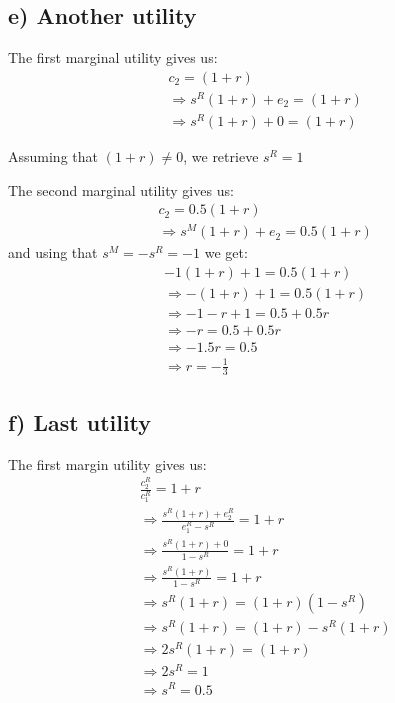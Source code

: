 \documentclass[11pt,a4paper]{article}
\begin{document}
\subsection*{e) Another utility}
The first marginal utility gives us:
\begin{align*}
&c_2 = (1+r) \\
&\Rightarrow s^R(1+r) + e_2 = (1+r) \\
&\Rightarrow s^R(1+r) + 0 = (1+r)
\end{align*}

Assuming that $(1+r) \neq 0$, we retrieve $s^R = 1$

The second marginal utility gives us:
\begin{align*}
&c_2 = 0.5(1+r) \\
&\Rightarrow s^M(1+r) + e_2 = 0.5(1+r)
\end{align*}
and using that $s^M = -s^R = -1$ we get:
\begin{align*}
&-1(1+r) + 1 = 0.5(1+r) \\
&\Rightarrow -(1+r) + 1 = 0.5(1+r) \\
&\Rightarrow -1 - r + 1 = 0.5 + 0.5r \\
&\Rightarrow -r = 0.5 + 0.5r \\
&\Rightarrow -1.5r = 0.5 \\
&\Rightarrow r = -\frac{1}{3}
\end{align*}

\subsection*{f) Last utility}
The first margin utility gives us:
\begin{align*}
&\frac{c_2^R}{c_1^R} = 1+r \\
&\Rightarrow \frac{s^R(1+r) + e_2^R}{e_1^R - s^R} = 1+r \\
&\Rightarrow \frac{s^R(1+r) + 0}{1 - s^R} = 1+r \\
&\Rightarrow \frac{s^R(1+r)}{1 - s^R} = 1+r \\
&\Rightarrow s^R(1+r) = (1+r)(1 - s^R) \\
&\Rightarrow s^R(1+r) = (1+r) - s^R(1+r) \\
&\Rightarrow 2s^R(1+r) = (1+r) \\
&\Rightarrow 2s^R = 1 \\
&\Rightarrow s^R = 0.5
\end{align*}
\end{document}
